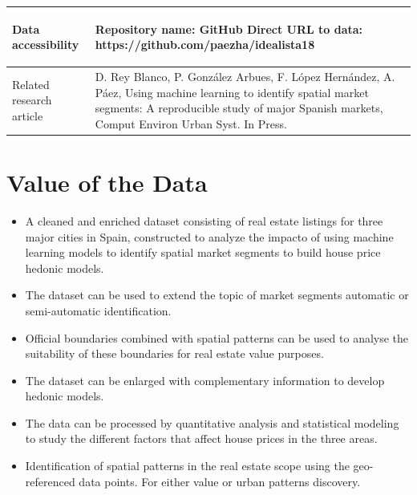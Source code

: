 \documentclass[times,final]{elsarticle}
\begin{document}
{\begin{longtable}{|p{33mm}|p{94mm}|}
%
%
\hline
\hypertarget{target1}
{Data accessibility}   & Repository name: GitHub\newline
                         Direct URL to data: https://github.com/paezha/idealista18\newline
                         \\
\hline
Related
research\newline
article                & D. Rey Blanco, P. González Arbues, F. López Hernández, A. Páez, Using machine learning to identify spatial market segments: A reproducible study of major Spanish markets, Comput Environ Urban Syst. In Press.\newline
\end{longtable}
}

\section*{Value of the Data}

\begin{itemize}
\itemsep=0pt
\parsep=0pt
  \item A cleaned and enriched dataset consisting of real estate listings for three major cities in Spain, constructed to analyze the impacto of using machine learning models to identify spatial market segments to build house price hedonic models.
  \item The dataset can be used to extend the topic of market segments automatic or semi-automatic identification.
    \item Official boundaries combined with spatial patterns can be used to analyse the suitability of these boundaries for real estate value purposes.
  \item The dataset can be enlarged with complementary information to develop hedonic models.
  \item The data can be processed by quantitative analysis and statistical modeling to study the different factors that affect house prices in the three areas.
  \item Identification of spatial patterns in the real estate scope using the geo-referenced data points. For either value or urban patterns discovery.
\end{itemize}
\end{document}
